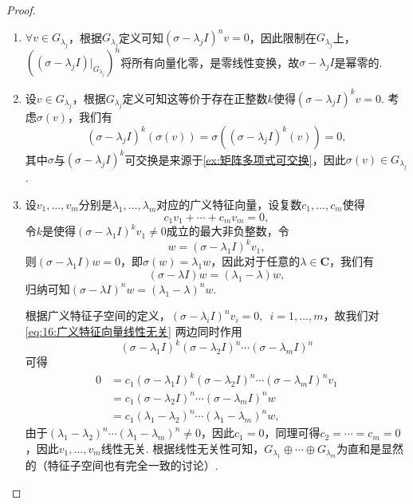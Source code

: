 \begin{proof}
    \begin{enumerate}
        \item $\forall v\in G_{\lambda_j}$，根据$G_{\lambda_j}$定义可知$(\sigma-\lambda_j I)^nv=0$，因此限制在$G_{\lambda_j}$上，$((\sigma-\lambda_j I)\vert_{G_{\lambda_j}})^n$将所有向量化零，是零线性变换，故$\sigma-\lambda_j I$是幂零的.

        \item 设$v\in G_{\lambda_j}$，根据$G_{\lambda_j}$定义可知这等价于存在正整数$k$使得$(\sigma-\lambda_j I)^kv=0$. 考虑$\sigma(v)$，我们有
              \[(\sigma-\lambda_j I)^k(\sigma(v))=\sigma((\sigma-\lambda_j I)^k(v))=0,\]
              其中$\sigma$与$(\sigma-\lambda_j I)^k$可交换是来源于\autoref{ex:矩阵多项式可交换}，因此$\sigma(v)\in G_{\lambda_j}$.

        \item 设$v_1,\ldots,v_m$分别是$\lambda_1,\ldots,\lambda_m$对应的广义特征向量，设复数$c_1,\ldots,c_m$使得
              \begin{equation} \label{eq:16:广义特征向量线性无关}
                  c_1v_1+\cdots+c_mv_m=0,
              \end{equation}
              令$k$是使得$(\sigma-\lambda_1 I)^kv_1\neq 0$成立的最大非负整数，令
              \[w=(\sigma-\lambda_1 I)^{k}v_1,\]
              则$(\sigma-\lambda_1 I)w=0$，即$\sigma(w)=\lambda_1w$，因此对于任意的$\lambda\in\mathbf{C}$，我们有
              \[(\sigma-\lambda I)w=(\lambda_1-\lambda)w,\]
              归纳可知$(\sigma-\lambda I)^nw=(\lambda_1-\lambda)^nw$.

              根据广义特征子空间的定义，$(\sigma-\lambda_i I)^nv_i=0,\enspace i=1,\ldots,m$，故我们对\autoref{eq:16:广义特征向量线性无关} 两边同时作用
              \[(\sigma-\lambda_1 I)^k(\sigma-\lambda_2 I)^n\cdots(\sigma-\lambda_m I)^n\]
              可得
              \begin{align*}
                  0 & = c_1(\sigma-\lambda_1 I)^k(\sigma-\lambda_2 I)^n\cdots(\sigma-\lambda_m I)^nv_1 \\
                    & = c_1(\sigma-\lambda_2 I)^n\cdots(\sigma-\lambda_m I)^nw                         \\
                    & = c_1(\lambda_1-\lambda_2)^n\cdots(\lambda_1-\lambda_m)^nw,
              \end{align*}
              由于$(\lambda_1-\lambda_2)^n\cdots(\lambda_1-\lambda_m)^n\neq 0$，因此$c_1=0$，同理可得$c_2=\cdots=c_m=0$，因此$v_1,\ldots,v_m$线性无关. 根据线性无关性可知，$G_{\lambda_1}\oplus\cdots\oplus G_{\lambda_m}$为直和是显然的（特征子空间也有完全一致的讨论）.


\end{enumerate}
\end{proof}
